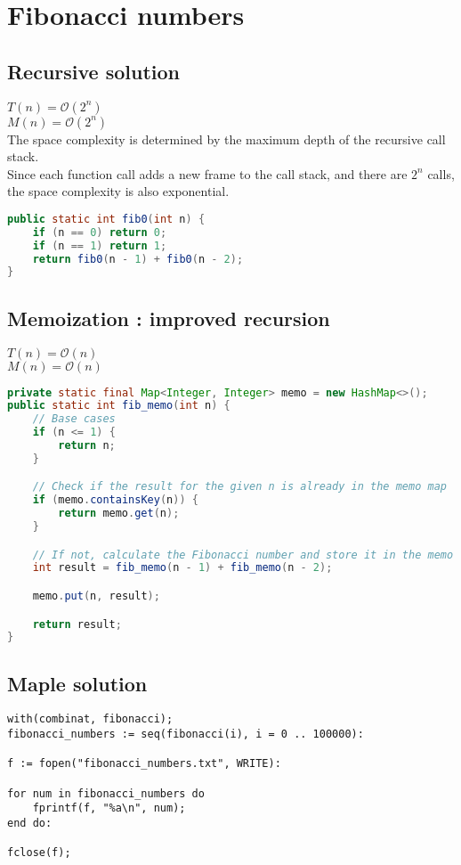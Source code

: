\documentclass{article}
\begin{document}
\section{Fibonacci numbers}
\subsection{Recursive solution}
$T(n) = \mathcal{O}(2^{n})$ \\
$M(n) = \mathcal{O}(2^{n})$ \\
The space complexity is determined by the maximum depth of the recursive call stack.\\
Since each function call adds a new frame to the call stack, and there are $2^n$ calls, the space complexity is also exponential.\\
\begin{lstlisting}[language=Java]
public static int fib0(int n) {
	if (n == 0) return 0;
	if (n == 1) return 1;
	return fib0(n - 1) + fib0(n - 2);
}
\end{lstlisting}

\subsection{Memoization : improved recursion}
$T(n) = \mathcal{O}(n)$ \\
$M(n) = \mathcal{O}(n)$ \\
\newpage
\begin{lstlisting}[float=h, language=Java]
private static final Map<Integer, Integer> memo = new HashMap<>();
public static int fib_memo(int n) {
	// Base cases
	if (n <= 1) {
		return n;
	}

	// Check if the result for the given n is already in the memo map
	if (memo.containsKey(n)) {
		return memo.get(n);
	}

	// If not, calculate the Fibonacci number and store it in the memo map
	int result = fib_memo(n - 1) + fib_memo(n - 2);

	memo.put(n, result);

	return result;
}
\end{lstlisting}


\subsection{Maple solution}
\begin{lstlisting}[language=Maple]
with(combinat, fibonacci);
fibonacci_numbers := seq(fibonacci(i), i = 0 .. 100000):

f := fopen("fibonacci_numbers.txt", WRITE):

for num in fibonacci_numbers do
	fprintf(f, "%a\n", num);
end do:

fclose(f);
\end{lstlisting}
\end{document}
